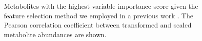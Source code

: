 \begin{figure}[ht]
	\caption[Feature selection]{Metabolites with the highest variable importance score given the feature selection method we employed in a previous work \cite{trainor2018}. The Pearson correlation coefficient between transformed and scaled metabolite abundances are shown. \label{fig:include}}
\end{figure}